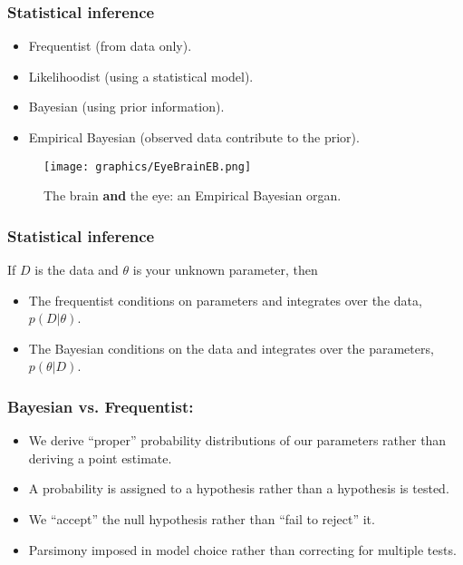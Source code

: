 \documentclass{beamer}
\newcommand{\1}{\ensuremath{\mathbf{1}}}
\begin{document}
%
%
%
\begin{frame}\frametitle{Statistical inference}
	\begin{itemize}
		\item Frequentist (from data only).
		\item Likelihoodist (using a statistical model).
		\item Bayesian (using prior information).
		\item Empirical Bayesian (observed data contribute to the prior).
	\end{itemize}
	\begin{figure}
	\begin{center}
		\texttt{[image: graphics/EyeBrainEB.png]}
	\end{center}
	\caption{The brain \textbf{and} the eye: an Empirical Bayesian organ.}
	\end{figure}
\end{frame}
%
%
%
\begin{frame}\frametitle{Statistical inference}
	If $D$ is the data and $\theta$ is your unknown parameter, then
	\begin{itemize}
		\item The frequentist conditions on parameters and integrates over the data, $p(D|\theta)$.
		\item The Bayesian conditions on the data and integrates over the parameters, $p(\theta|D)$.
	\end{itemize}
\end{frame}
%
%
%
\begin{frame}\frametitle{Bayesian vs. Frequentist:}
	\begin{itemize}
		\item We derive ``proper'' probability distributions of our parameters rather than deriving a point estimate.
		\item A probability is assigned to a hypothesis rather than a hypothesis is tested.
		\item We ``accept'' the null hypothesis rather than ``fail to reject'' it.
		\item Parsimony imposed in model choice rather than correcting for multiple tests.
	\end{itemize}
\end{frame}
\end{document}

